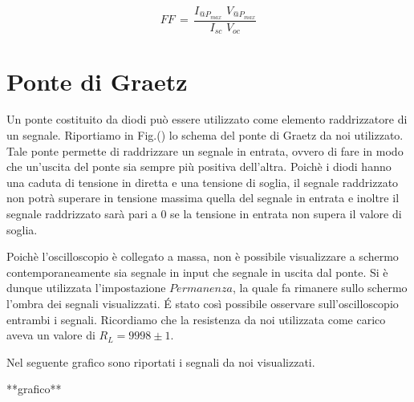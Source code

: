 \begin{equation}
FF \, = \, \frac{I_{@P_{max}} \,\, V_{@P_{max}}}{I_{sc} \,\, V_{oc}}
\label{eq:FF}
\end{equation}



\section{Ponte di Graetz}

Un ponte costituito da diodi può essere utilizzato come elemento raddrizzatore di un segnale. Riportiamo in Fig.() lo schema del ponte di Graetz da noi utilizzato. Tale ponte permette di raddrizzare un segnale in entrata, ovvero di fare in modo che un'uscita del ponte sia sempre più positiva dell'altra. Poichè i diodi hanno una caduta di tensione in diretta e una tensione di soglia, il segnale raddrizzato non potrà superare in tensione massima quella del segnale in entrata e inoltre il segnale raddrizzato sarà pari a 0 se la tensione in entrata non supera il valore di soglia.

Poichè l'oscilloscopio è collegato a massa, non è possibile visualizzare a schermo contemporaneamente sia segnale in input che segnale in uscita dal ponte. Si è dunque utilizzata l'impostazione $Permanenza$, la quale fa rimanere sullo schermo l'ombra dei segnali visualizzati. \'E stato così possibile osservare sull'oscilloscopio entrambi i segnali. Ricordiamo che la resistenza da noi utilizzata come carico aveva un valore di $R_L=9998 \pm 1$.

Nel seguente grafico sono riportati i segnali da noi visualizzati.

**grafico**


